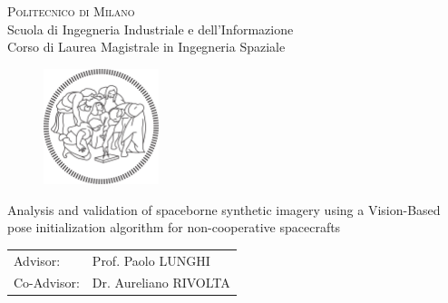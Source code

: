 \begin{titlepage}

\begin{center}
\Large{\textsc{Politecnico di Milano}}\\
\Large{Scuola di Ingegneria Industriale e dell'Informazione}\\
\large{Corso di Laurea Magistrale in Ingegneria Spaziale}\\
\par
\par
\end{center}

\vspace{0.5cm}

\begin{center}
\begin{figure}[h!]
\centering{}
\includegraphics[width=0.3\textwidth]{title-page/logo-polimi-new}
\end{figure}
\vspace{1cm}
\par
\end{center}

\begin{center}
\LARGE{Analysis and validation of spaceborne synthetic imagery using a Vision-Based pose initialization algorithm for non-cooperative spacecrafts}
\vspace{2cm}
\par
\end{center}

\begin{flushleft}
\begin{tabular}{ll}
Advisor:  & Prof. Paolo LUNGHI\tabularnewline
Co-Advisor:  & Dr. Aureliano RIVOLTA\tabularnewline %
\end{tabular}\vspace{1cm}
\par
\end{flushleft}


\end{titlepage}
